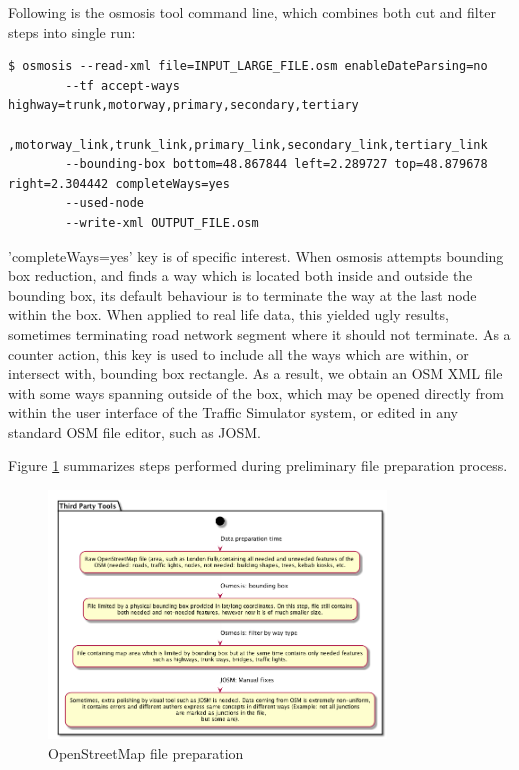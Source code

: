 Following is the osmosis tool command line, which combines both cut and filter steps into single run:
\begin{lstlisting}
$ osmosis --read-xml file=INPUT_LARGE_FILE.osm enableDateParsing=no
        --tf accept-ways highway=trunk,motorway,primary,secondary,tertiary
            ,motorway_link,trunk_link,primary_link,secondary_link,tertiary_link
        --bounding-box bottom=48.867844 left=2.289727 top=48.879678 right=2.304442 completeWays=yes
        --used-node
        --write-xml OUTPUT_FILE.osm
\end{lstlisting}
'completeWays=yes' key is of specific interest. When osmosis attempts bounding box reduction, and finds a way which is located both inside and outside the bounding box, its default behaviour is to terminate the way at the last node within the box. When applied to real life data, this yielded ugly results, sometimes terminating road network segment where it should not terminate. As a counter action, this key is used to include all the ways which are within, or intersect with, bounding box rectangle.  As a result, we obtain an OSM XML file with some ways spanning outside of the box, which may be opened directly from within the user interface of the Traffic Simulator system, or edited in any standard OSM file editor, such as JOSM.

Figure \ref{fig:thirdPartyToolsOSMPreparation} summarizes steps performed during preliminary file preparation process.
\begin{figure}[h]
    \caption{OpenStreetMap file preparation}
    \label{fig:thirdPartyToolsOSMPreparation}
    \centering
    \includegraphics[width=0.8\textwidth]{../../uml_diagrams/thirdPartyToolsDataLoading.png}
\end{figure}


